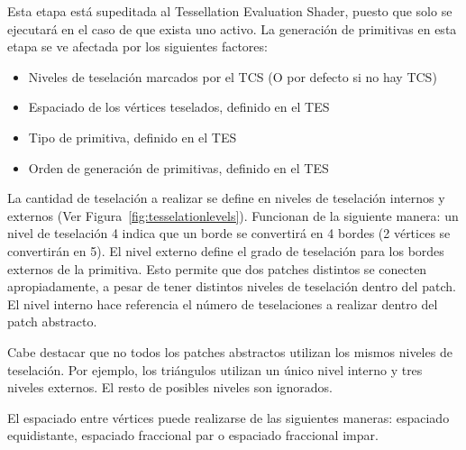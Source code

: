 Esta etapa está supeditada al Tessellation Evaluation Shader, puesto que solo
se ejecutará en el caso de que exista uno activo. La generación de primitivas en
esta etapa se ve afectada por los siguientes factores:

\begin{itemize}
		\item Niveles de teselación marcados por el TCS (O por defecto si no hay
				TCS)
		\item Espaciado de los vértices teselados, definido en el TES
		\item Tipo de primitiva, definido en el TES
		\item Orden de generación de primitivas, definido en el TES
\end{itemize}

La cantidad de teselación a realizar se define en niveles de teselación internos
y externos (Ver Figura~\ref{fig:tesselationlevels}). Funcionan de la siguiente
manera: un nivel de teselación 4 indica que un borde se convertirá en 4 bordes
(2 vértices se convertirán en 5). El nivel externo define el grado de teselación
para los bordes externos de la primitiva. Esto permite que dos patches distintos
se conecten apropiadamente, a pesar de tener distintos niveles de teselación
dentro del patch. El nivel interno hace referencia el número de teselaciones a
realizar dentro del patch abstracto. 

Cabe destacar que no todos los patches abstractos utilizan los mismos niveles de
teselación. Por ejemplo, los triángulos utilizan un único nivel interno y tres
niveles externos. El resto de posibles niveles son ignorados. 

El espaciado entre vértices puede realizarse de las siguientes maneras:
espaciado equidistante, espaciado fraccional par o espaciado fraccional impar.

